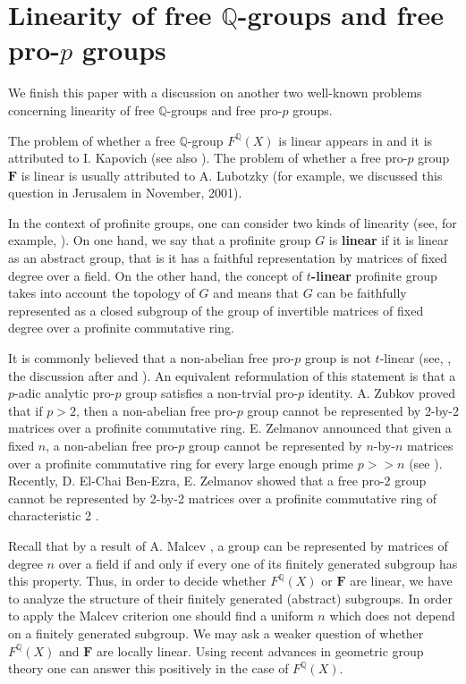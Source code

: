 \documentclass[11pt]{amsart}
\numberwithin{claimcounter}{lem}
\newcommand{\Q}{\mathbb{Q}}
\begin{document}
 
 \section{Linearity of free $\Q$-groups and free pro-$p$ groups}\label{linearity}
 We finish this  paper with a discussion on another two well-known problems concerning linearity of free $\Q$-groups and free pro-$p$ groups. 
 
 The problem of whether a free $\Q$-group $F^{\Q}(X)$ is linear appears in \cite[Problem F13]{BMS} and it is attributed to I. Kapovich (see also \cite[Problem 13.39(b)]{Kou}).
  The problem of whether a free pro-$p$ group $\mathbf F$ is linear is usually attributed to A. Lubotzky  (for example, we discussed this question  in Jerusalem in November,  2001). 
  
  In the context of  profinite groups, one can consider two kinds of linearity (see, for example, \cite{Ja02}). On one hand, we say that a profinite group $G$ is {\bf linear} if  it is linear as an abstract group, that is  it has a faithful representation by 
matrices of fixed degree over a field. On the other hand, the concept of {\bf $t$-linear} profinite group takes into account the topology of $G$ and means that $G$ can be faithfully  represented as a closed subgroup of the group of invertible  matrices of fixed degree over a profinite commutative ring. 

It is commonly believed that a non-abelian free pro-$p$ group is not $t$-linear (see, \cite[Conjecture 3.8]{LS94}, the discussion after \cite[Theorem 1.1]{BL99} and \cite[Section 5.3]{Sh00}). An equivalent reformulation of this statement is that a $p$-adic analytic pro-$p$ group  satisfies  a non-trvial pro-$p$ identity. A.  Zubkov \cite{Zu87}  proved  that if $p>2$, then a non-abelian free pro-$p$ group cannot be represented by 2-by-2 matrices over a profinite commutative ring.    E. Zelmanov announced that given a
fixed $n$, a non-abelian free pro-$p$ group cannot be represented by $n$-by-$n$ matrices over a profinite commutative ring   for every large enough prime
$p>>n$ (see \cite{Ze05,Ze16}). Recently, D. El-Chai Ben-Ezra, E. Zelmanov  showed that a free pro-2 group  cannot be represented by 2-by-2 matrices over a profinite commutative ring of characteristic 2 \cite{EZ19}. 

Recall that by a result of A. Malcev \cite[Theorem IV]{Ma40}, a group can be represented by matrices of degree $n$ over a field if and only if every one of its finitely generated subgroup has this property. Thus, in order to decide  whether $F^{\Q}(X)$ or  $\mathbf F$ are linear, we have to analyze the structure of their finitely generated (abstract) subgroups.  In order to apply the Malcev criterion one should find  a uniform $n$ which does not depend on a finitely generated subgroup. We may ask a weaker question of whether $F^{\Q}(X)$ and $\mathbf F$ are locally linear. Using recent advances in geometric group theory one can answer this positively in the case of $F^{\Q}(X)$.
\end{document}
